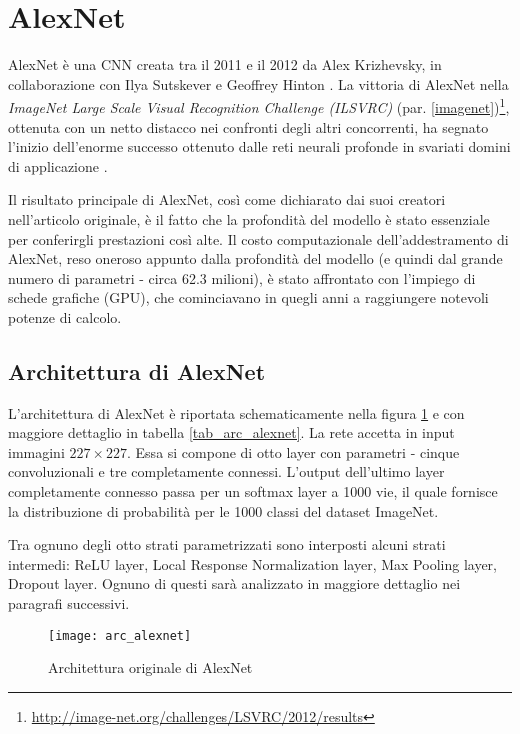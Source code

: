 \section{AlexNet}\label{alexnet}
AlexNet è una CNN creata tra il 2011 e il 2012 da Alex Krizhevsky, in collaborazione con Ilya Sutskever e Geoffrey Hinton \cite{alexnet}. La vittoria di AlexNet nella \textit{ImageNet Large Scale Visual Recognition Challenge (ILSVRC)} (par. \ref{imagenet})\footnote{\url{http://image-net.org/challenges/LSVRC/2012/results}}, ottenuta con un netto distacco nei confronti degli altri concorrenti, ha segnato l'inizio dell'enorme successo ottenuto dalle reti neurali profonde in svariati domini di applicazione \cite{historydl}.

Il risultato principale di AlexNet, così come dichiarato dai suoi creatori nell'articolo originale, è il fatto che la profondità del modello è stato essenziale per conferirgli prestazioni così alte. Il costo computazionale dell'addestramento di AlexNet, reso oneroso appunto dalla profondità del modello (e quindi dal grande numero di parametri - circa 62.3 milioni), è stato affrontato con l'impiego di schede grafiche (GPU), che cominciavano in quegli anni a raggiungere notevoli potenze di calcolo.

\subsection{Architettura di AlexNet}
L'architettura di AlexNet è riportata schematicamente nella figura \ref{arc_alexnet} e con maggiore dettaglio in tabella \ref{tab_arc_alexnet}.
La rete accetta in input immagini $227\times 227$. Essa si compone di otto layer con parametri - cinque convoluzionali e tre completamente connessi. L'output dell'ultimo layer completamente connesso passa per un softmax layer a 1000 vie, il quale fornisce la distribuzione di probabilità per le 1000 classi del dataset ImageNet.

Tra ognuno degli otto strati parametrizzati sono interposti alcuni strati intermedi: ReLU layer, Local Response Normalization layer, Max Pooling layer, Dropout layer. Ognuno di questi sarà analizzato in maggiore dettaglio nei paragrafi successivi.

\begin{figure}[h]
\centering
\texttt{[image: arc\_alexnet]}
\caption{Architettura originale di AlexNet \cite{alexnet}}
\label{arc_alexnet}
\end{figure}

